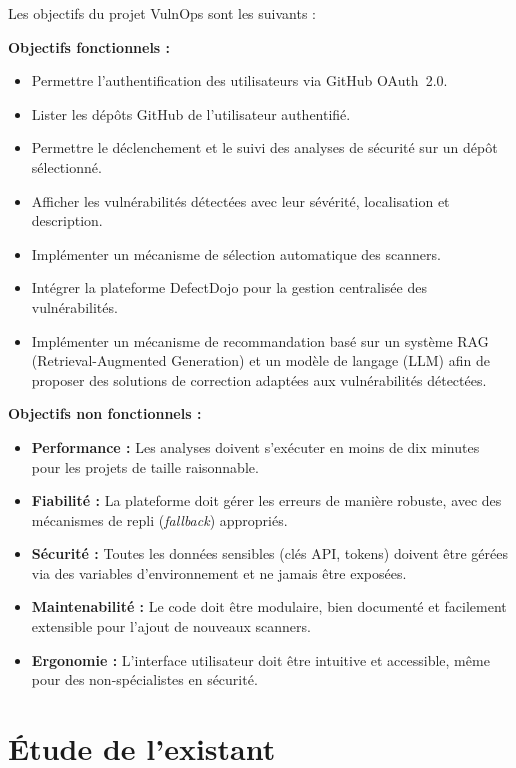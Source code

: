 \documentclass[12pt, a4paper, oneside]{report}
\begin{document}
Les objectifs du projet VulnOps sont les suivants :

\textbf{Objectifs fonctionnels :}
\begin{itemize}
    \item Permettre l'authentification des utilisateurs via GitHub OAuth~2.0.
    \item Lister les dépôts GitHub de l'utilisateur authentifié.
    \item Permettre le déclenchement et le suivi des analyses de sécurité sur
    un dépôt sélectionné.
    \item Afficher les vulnérabilités détectées avec leur sévérité, localisation
    et description.
    \item Implémenter un mécanisme de sélection automatique des scanners.
        \item Intégrer la plateforme DefectDojo pour la gestion centralisée des
    vulnérabilités.
    \item Implémenter un mécanisme de recommandation basé sur un système RAG (Retrieval-Augmented Generation) et un modèle de langage (LLM) afin de proposer des solutions de correction adaptées aux vulnérabilités détectées.
\end{itemize}

\textbf{Objectifs non fonctionnels :}
\begin{itemize}
    \item \textbf{Performance :} Les analyses doivent s'exécuter en moins de
    dix minutes pour les projets de taille raisonnable.
    \item \textbf{Fiabilité :} La plateforme doit gérer les erreurs de manière
    robuste, avec des mécanismes de repli (\textit{fallback}) appropriés.
    \item \textbf{Sécurité :} Toutes les données sensibles (clés API, tokens)
    doivent être gérées via des variables d'environnement et ne jamais être
    exposées.
    \item \textbf{Maintenabilité :} Le code doit être modulaire, bien documenté
    et facilement extensible pour l'ajout de nouveaux scanners.
    \item \textbf{Ergonomie :} L'interface utilisateur doit être intuitive et
    accessible, même pour des non-spécialistes en sécurité.
\end{itemize}

\section{Étude de l'existant}
\label{sec:existant}
\end{document}
